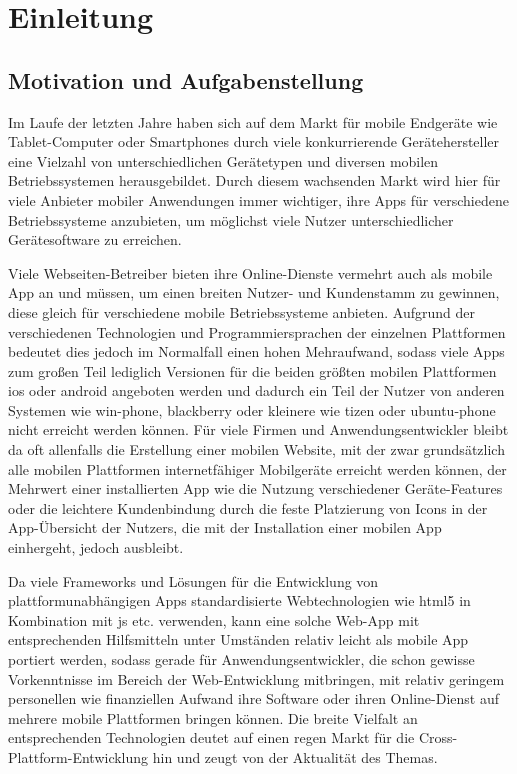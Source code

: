 
\chapter{Einleitung} \label{sec:einleitung}

\section{Motivation und Aufgabenstellung}

Im Laufe der letzten Jahre haben sich auf dem Markt für mobile Endgeräte wie Tablet-Computer oder Smartphones durch viele konkurrierende Gerätehersteller eine Vielzahl von unterschiedlichen Gerätetypen und diversen mobilen Betriebssystemen herausgebildet.
Durch diesem wachsenden Markt wird hier für viele Anbieter mobiler Anwendungen immer wichtiger, ihre Apps für verschiedene Betriebssysteme anzubieten, um möglichst viele Nutzer unterschiedlicher Gerätesoftware zu erreichen. %

Viele Webseiten-Betreiber bieten ihre Online-Dienste vermehrt auch als mobile App an und müssen, um einen breiten Nutzer- und Kundenstamm zu gewinnen, diese gleich für verschiedene mobile Betriebssysteme anbieten.
Aufgrund der verschiedenen Technologien und Programmiersprachen der einzelnen Plattformen bedeutet dies jedoch im Normalfall einen hohen Mehraufwand, sodass viele Apps zum großen Teil lediglich Versionen für die beiden größten mobilen Plattformen \gls{ios} oder \gls{android} angeboten werden und dadurch ein Teil der Nutzer von anderen Systemen wie \gls{win-phone}, \gls{blackberry} oder kleinere wie \gls{tizen} oder \gls{ubuntu-phone} nicht erreicht werden können. 
Für viele Firmen und Anwendungsentwickler bleibt da oft allenfalls die Erstellung einer mobilen Website, mit der zwar grundsätzlich alle mobilen Plattformen internetfähiger Mobilgeräte erreicht werden können, der Mehrwert einer installierten App wie die Nutzung verschiedener Geräte-Features oder die leichtere Kundenbindung durch die feste Platzierung von Icons in der App-Übersicht der Nutzers, die mit der Installation einer mobilen App einhergeht, jedoch ausbleibt.

Da viele Frameworks und Lösungen für die Entwicklung von plattformunabhängigen Apps standardisierte Webtechnologien wie \gls{html5} in Kombination mit \gls{js} etc. verwenden, kann eine solche Web-App mit entsprechenden Hilfsmitteln unter Umständen relativ leicht als mobile App portiert werden, sodass gerade für Anwendungsentwickler, die schon gewisse Vorkenntnisse im Bereich der Web-Entwicklung mitbringen, mit relativ geringem personellen wie finanziellen Aufwand ihre Software oder ihren Online-Dienst auf mehrere mobile Plattformen bringen können.
Die breite Vielfalt an entsprechenden Technologien deutet auf einen regen Markt für die Cross-Plattform-Entwicklung hin und zeugt von der Aktualität des Themas.

